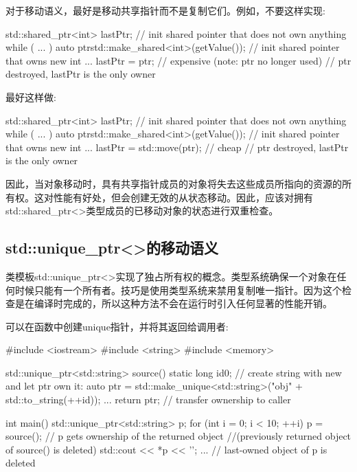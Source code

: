 对于移动语义，最好是移动共享指针而不是复制它们。例如，不要这样实现:

\begin{cppcode}
std::shared_ptr<int> lastPtr; // init shared pointer that does not own anything
while ( ... ) {
	auto ptr{std::make_shared<int>(getValue())}; // init shared pointer that owns new int
	...
	lastPtr = ptr; // expensive (note: ptr no longer used)
} // ptr destroyed, lastPtr is the only owner
\end{cppcode}

最好这样做:

\begin{cppcode}
std::shared_ptr<int> lastPtr; // init shared pointer that does not own anything
while ( ... ) {
	auto ptr{std::make_shared<int>(getValue())}; // init shared pointer that owns new int
	...
	lastPtr = std::move(ptr); // cheap
} // ptr destroyed, lastPtr is the only owner
\end{cppcode}

因此，当对象移动时，具有共享指针成员的对象将失去这些成员所指向的资源的所有权。这对性能有好处，但会创建无效的从状态移动。因此，应该对拥有std::shared_ptr<>类型成员的已移动对象的状态进行双重检查。

\subsection{std::unique_ptr<>的移动语义}

类模板std::unique_ptr<>实现了独占所有权的概念。类型系统确保一个对象在任何时候只能有一个所有者。技巧是使用类型系统来禁用复制唯一指针。因为这个检查是在编译时完成的，所以这种方法不会在运行时引入任何显著的性能开销。

可以在函数中创建unique指针，并将其返回给调用者:

\begin{cppcode}
#include <iostream>
#include <string>
#include <memory>

std::unique_ptr<std::string> source()
{
	static long id{0};
	// create string with new and let ptr own it:
	auto ptr = std::make_unique<std::string>("obj" + std::to_string(++id));
	...
	return ptr; // transfer ownership to caller
}

int main()
{
	std::unique_ptr<std::string> p;
	for (int i = 0; i < 10; ++i) {
		p = source(); // p gets ownership of the returned object
		              //(previously returned object of source() is deleted)
		std::cout << *p << '\n';
		...
	}
} // last-owned object of p is deleted
\end{cppcode}

